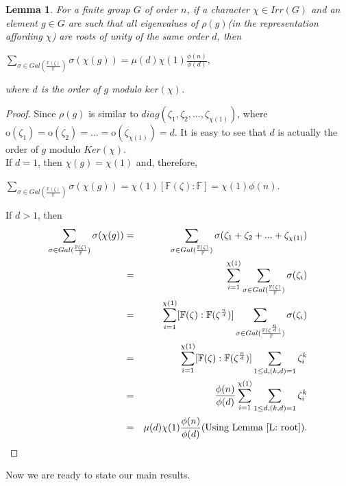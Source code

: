 \documentclass[12pt, reqno]{amsart}
\numberwithin{equation}{section}
\theoremstyle{definition}
\theoremstyle{remark}
\theoremstyle{plain}
\newtheorem{lemma}[definition]{Lemma}
\begin{document}
\begin{lemma}\label{L: order}
For a finite group $G$ of order $n$, if a character $\chi\in Irr(G)$ and an element $g\in G$ are such that all eigenvalues of $\rho(g)$(in the representation affording $\chi$) are roots of unity of the same order $d$, then
    \begin{center}
       $\sum_{\sigma \in Gal(\frac{\mathbb{F}(\zeta)}{\mathbb{F}})} \sigma(\chi(g)) = \mu(d)\chi(1)\frac{\phi(n)}{\phi(d)},$
    \end{center}
where $d$ is the order of $g$ modulo $ker(\chi)$.
\end{lemma}
\begin{proof} 
Since $\rho(g)$ is similar to $diag(\zeta_1, \zeta_2,...,\zeta_{\chi(1)})$, where $\text{o}(\zeta_1)=\text{o}(\zeta_2) =...=  \text{o}(\zeta_{\chi(1)}) = d$. It is easy to see that $d$ is actually the order of $g$ modulo $Ker(\chi)$.\\
If $d=1$, then $\chi(g)=\chi(1)$ and, therefore,
\begin{center}
  $\sum_{\sigma \in Gal(\frac{\mathbb{F}(\zeta)}{\mathbb{F}})} \sigma(\chi(g))=\chi(1)[\mathbb{F}(\zeta):\mathbb{F}]=\chi(1)\phi(n)$.
\end{center}
If $d>1$, then
\begin{eqnarray}\nonumber
  \sum_{\sigma \in Gal(\frac{\mathbb{F}(\zeta)}{\mathbb{F}})} \sigma(\chi(g)) &=& \sum_{\sigma \in Gal(\frac{\mathbb{F}(\zeta)}{\mathbb{F}})}\sigma(\zeta_1 + \zeta_2 + ...+ \zeta_{\chi(1)}) \\\nonumber
   &=& \sum_{i=1}^{\chi(1)}\sum_{\sigma \in Gal(\frac{\mathbb{F}(\zeta)}{\mathbb{F}})} \sigma(\zeta_i) \\\nonumber
   &=& \sum_{i=1}^{\chi(1)}[\mathbb{F}(\zeta):\mathbb{F}(\zeta^{\frac{n}{d}})]\sum_{\sigma \in Gal(\frac{\mathbb{F}(\zeta^{\frac{n}{d}})}{\mathbb{F}})} \sigma(\zeta_i) \\\nonumber
   &=&\sum_{i=1}^{\chi(1)}[\mathbb{F}(\zeta):\mathbb{F}(\zeta^{\frac{n}{d}})]\sum_{1\leq d,(k,d)=1}\zeta^{k}_i  \\\nonumber
   &=& \frac{\phi(n)}{\phi(d)}\sum_{i=1}^{\chi(1)}\sum_{1\leq d,(k,d)=1}\zeta^{k}_i \\\nonumber
   &=& \mu(d)\chi(1)\frac{\phi(n)}{\phi(d)}   \hfill (\text{Using Lemma \ref{L: root}})\nonumber.
\end{eqnarray}
\end{proof}
Now we are ready to state our main results.
\end{document}
